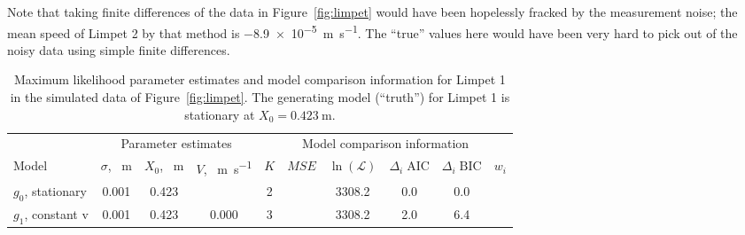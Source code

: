 Note that taking finite differences of the data in Figure~\ref{fig:limpet} would have been hopelessly fracked by the measurement noise; the mean speed of Limpet 2 by that method is \SI{-8.9e-5}{\meter\per\second}.  The ``true'' values here would have been very hard to pick out of the noisy data using simple finite differences.


\begin{table}
\caption{Maximum likelihood parameter estimates and model comparison information for Limpet 1 in the simulated data of Figure~\ref{fig:limpet}.  The generating model (``truth'') for Limpet 1 is stationary at $X_0 = \SI{0.423}{\meter}$.} 
\label{tbl:limpet}
\begin{tabular}{lccccccccc}
      & \multicolumn{3}{c}{Parameter estimates} & \multicolumn{6}{c}{Model comparison information} \\
Model & $\sigma$, \SI{}{\meter} & $X_0$, \SI{}{\meter} & $V$, \SI{}{\meter\per\second} & $K$ & $MSE$ & $\ln{(\mathcal{L})}$ & $\Delta_i\;\text{AIC}$ & $\Delta_i\;\text{BIC}$ & $w_i$ \\
\hline 
\rowcolor[gray]{0.8} $g_0$, stationary & \num{0.001} & \num{0.423} & \num{} & 2 & & \num{3308.2} & \num{0.0} & \num{0.0} & \\
$g_1$, constant v & \num{0.001} & \num{0.423} & \num{0.000} & 3 & & \num{3308.2} & \num{2.0}& \num{6.4} & \\
\end{tabular}
\end{table}

